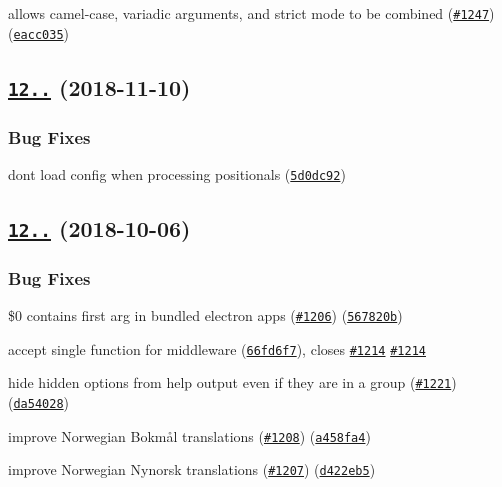 \begin{DoxyItemize}
\item allows camel-\/case, variadic arguments, and strict mode to be combined (\href{https://github.com/yargs/yargs/issues/1247}{\tt \#1247}) (\href{https://github.com/yargs/yargs/commit/eacc035}{\tt eacc035})
\end{DoxyItemize}

\label{_12.0.4}%
 \subsection*{\href{https://github.com/yargs/yargs/compare/v12.0.3...v12.0.4}{\tt 12..} (2018-\/11-\/10)}

\subsubsection*{Bug Fixes}


\begin{DoxyItemize}
\item don\textquotesingle{}t load config when processing positionals (\href{https://github.com/yargs/yargs/commit/5d0dc92}{\tt 5d0dc92})
\end{DoxyItemize}

\label{_12.0.3}%
 \subsection*{\href{https://github.com/yargs/yargs/compare/v12.0.2...v12.0.3}{\tt 12..} (2018-\/10-\/06)}

\subsubsection*{Bug Fixes}


\begin{DoxyItemize}
\item \$0 contains first arg in bundled electron apps (\href{https://github.com/yargs/yargs/issues/1206}{\tt \#1206}) (\href{https://github.com/yargs/yargs/commit/567820b}{\tt 567820b})
\item accept single function for middleware (\href{https://github.com/yargs/yargs/commit/66fd6f7}{\tt 66fd6f7}), closes \href{https://github.com/yargs/yargs/issues/1214}{\tt \#1214} \href{https://github.com/yargs/yargs/issues/1214}{\tt \#1214}
\item hide {\ttfamily hidden} options from help output even if they are in a group (\href{https://github.com/yargs/yargs/issues/1221}{\tt \#1221}) (\href{https://github.com/yargs/yargs/commit/da54028}{\tt da54028})
\item improve Norwegian Bokmål translations (\href{https://github.com/yargs/yargs/issues/1208}{\tt \#1208}) (\href{https://github.com/yargs/yargs/commit/a458fa4}{\tt a458fa4})
\item improve Norwegian Nynorsk translations (\href{https://github.com/yargs/yargs/issues/1207}{\tt \#1207}) (\href{https://github.com/yargs/yargs/commit/d422eb5}{\tt d422eb5})
\end{DoxyItemize}

